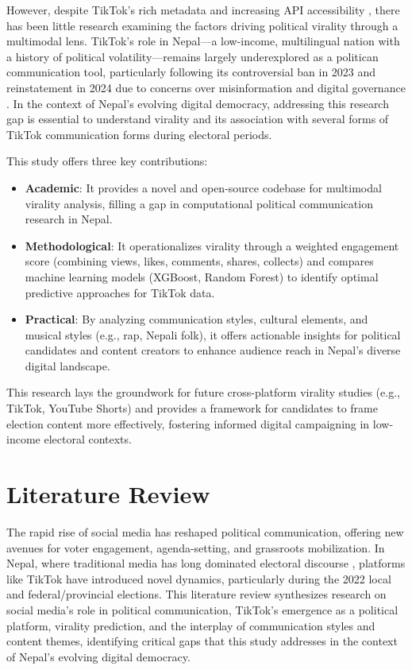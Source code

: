 \documentclass[12pt,a4paper]{report}
\begin{document}
However, despite TikTok’s rich metadata and increasing API accessibility \parencite{tiktokResearchAPI2025}, there has been little research examining the factors driving political virality through a multimodal lens. TikTok’s role in Nepal—a low-income, multilingual nation with a history of political volatility—remains largely underexplored as a politican communication tool, particularly following its controversial ban in 2023 and reinstatement in 2024 due to concerns over misinformation and digital governance \parencite{lamichhane2024tik, reuters2024tiktok}. In the context of Nepal’s evolving digital democracy, addressing this research gap is essential to understand virality and its association with several forms of TikTok communication forms   during electoral periods. 

This study offers three key contributions:
\begin{itemize}
    \item \textbf{Academic}: It provides a novel and open-source codebase for multimodal virality analysis, filling a gap in computational political communication research in Nepal.
    \item \textbf{Methodological}: It operationalizes virality through a weighted engagement score (combining views, likes, comments, shares, collects) and compares machine learning models (XGBoost, Random Forest) to identify optimal predictive approaches for TikTok data.
\newpage
    \item \textbf{Practical}: By analyzing communication styles, cultural elements, and musical styles (e.g., rap, Nepali folk), it offers actionable insights for political candidates and content creators to enhance audience reach in Nepal’s diverse digital landscape.
\end{itemize}

This research lays the groundwork for future cross-platform virality studies (e.g., TikTok, YouTube Shorts) and provides a framework for candidates to frame election content more effectively, fostering informed digital campaigning in low-income electoral contexts.
\newpage
\section{Literature Review}

The rapid rise of social media has reshaped political communication, offering new avenues for voter engagement, agenda-setting, and grassroots mobilization. In Nepal, where traditional media has long dominated electoral discourse \parencite{dahal2023influence}, platforms like TikTok have introduced novel dynamics, particularly during the 2022 local and federal/provincial elections. This literature review synthesizes research on social media’s role in political communication, TikTok’s emergence as a political platform, virality prediction, and the interplay of communication styles and content themes, identifying critical gaps that this study addresses in the context of Nepal’s evolving digital democracy.
\end{document}
